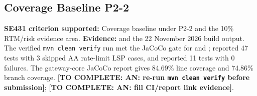 \documentclass[11pt,a4paper]{article}
\newcommand{\todo}[1]{\textcolor{red!70!black}{\textbf{[TO COMPLETE: #1]}}}
\begin{document}
\subsection{Coverage Baseline P2-2}
\textbf{SE431 criterion supported:} Coverage baseline under P2-2 and the 10\% RTM/risk evidence area. \textbf{Evidence:}  and the 22 November 2026 build output.\\
The verified \texttt{mvn clean verify} run met the JaCoCo gate for  and ;  reported 47 tests with 3 skipped AA rate-limit LSP cases, and  reported 11 tests with 0 failures. The gateway-core JaCoCo report gives 84.69\% line coverage and 74.86\% branch coverage. \todo{AN: re-run \texttt{mvn clean verify} before submission}; \todo{AN: fill CI/report link evidence}.
\end{document}
